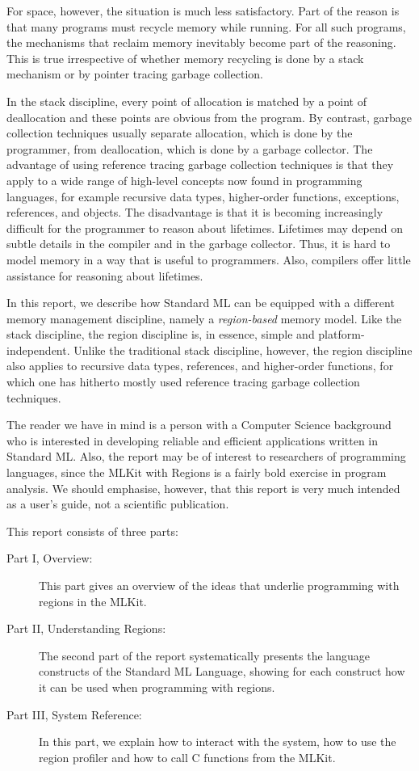 \documentclass[12pt]{book}
\begin{document}
For space, however, the situation is much less satisfactory. Part of the reason
is that many programs must recycle memory while running.  For all such programs,
the mechanisms that reclaim memory inevitably become part of the reasoning.
This is true irrespective of whether memory recycling is done by a
%
%
%
stack mechanism or by pointer tracing garbage collection.

In the stack discipline, every point of allocation is matched by a point of
deallocation and these points are obvious from the program. By contrast, garbage
collection techniques usually separate allocation, which is done by the
programmer, from deallocation, which is done by a garbage collector.  The
advantage of using reference tracing
%
%
%
garbage collection techniques is that they apply to a wide range of high-level
concepts now found in programming languages, for example recursive data types,
higher-order functions, exceptions, references, and objects. The disadvantage is
that it is becoming increasingly difficult for the programmer to reason about
lifetimes. Lifetimes may depend on subtle details in the compiler and in the
garbage collector.  Thus, it is hard to model memory in a way that is useful to
programmers. Also, compilers offer little assistance for reasoning about
lifetimes.

In this report, we describe how Standard ML can be equipped with a different
memory management discipline, namely a {\em region-based} memory model.  Like
the stack discipline, the region discipline is, in essence, simple and
platform-independent. Unlike the traditional stack discipline, however, the
region discipline also applies to recursive data types, references, and
higher-order functions, for which one has hitherto mostly used reference tracing
garbage collection techniques.

The reader we have in mind is a person with a Computer Science background who is
interested in developing reliable and efficient applications written in Standard
ML. Also, the report may be of interest to researchers of programming languages,
since the MLKit with Regions is a fairly bold exercise in program analysis. We
should emphasise, however, that this report is very much intended as a user's
guide, not a scientific publication.

This report consists of three parts:
\begin{description}
\item[Part I, Overview:] This part gives an overview of the ideas that underlie
  programming with regions in the MLKit.
\item[Part II, Understanding Regions:] The second part of the report
  systematically presents the language constructs of the Standard ML Language,
  showing for each construct how it can be used when programming with regions.
\item[Part III, System Reference:] In this part, we explain how to interact with
  the system, how to use the region profiler and how to call C functions from
  the MLKit.
\end{description}
\end{document}

